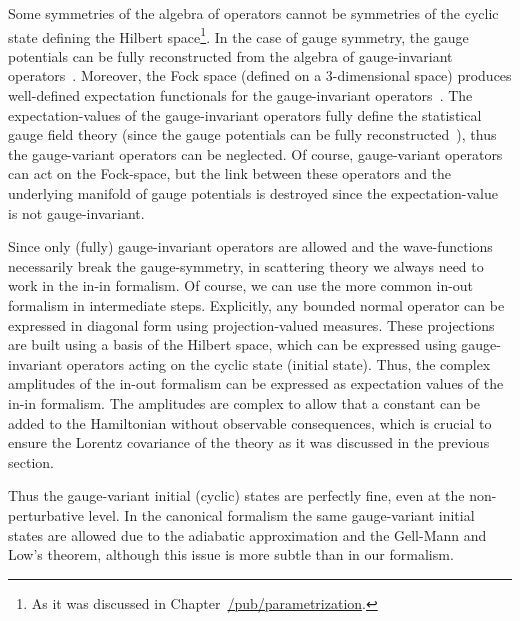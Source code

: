 \documentclass[11pt]{book}
\begin{document}
Some symmetries of the algebra of operators cannot be symmetries of the
cyclic state defining the Hilbert space\footnote{As it was discussed in
  Chapter~\href{https://timepiece.pubpub.org/pub/parametrization/\#gauge-transformations-constrained-systems-and-conditioned-probability}{/pub/parametrization}.}.
In the case of gauge symmetry, the gauge potentials can be fully
reconstructed from the algebra of gauge-invariant
operators~\cite{Giles1981Reconstruction}. Moreover, the Fock space (defined on a 3-dimensional space)
produces well-defined expectation functionals for the gauge-invariant
operators~\cite{Franuxe7ois2014Gauge}. The expectation-values of the gauge-invariant
operators fully define the statistical gauge field theory (since the
gauge potentials can be fully
reconstructed~\cite{Giles1981Reconstruction}), thus the gauge-variant operators can be neglected. Of course,
gauge-variant operators can act on the Fock-space, but the link between
these operators and the underlying manifold of gauge potentials is
destroyed since the expectation-value is not gauge-invariant.

Since only (fully) gauge-invariant operators are allowed and the
wave-functions necessarily break the gauge-symmetry, in scattering
theory we always need to work in the in-in formalism. Of course, we can
use the more common in-out formalism in intermediate steps. Explicitly,
any bounded normal operator can be expressed in diagonal form using
projection-valued measures. These projections are built using a basis of
the Hilbert space, which can be expressed using gauge-invariant
operators acting on the cyclic state (initial state). Thus, the complex
amplitudes of the in-out formalism can be expressed as expectation
values of the in-in formalism. The amplitudes are complex to allow that
a constant can be added to the Hamiltonian without observable
consequences, which is crucial to ensure the Lorentz covariance of the
theory as it was discussed in the previous section.

Thus the gauge-variant initial (cyclic) states are perfectly fine, even
at the non-perturbative level. In the canonical formalism the same
gauge-variant initial states are allowed due to the adiabatic
approximation and the Gell-Mann and Low's
theorem\cite{Molinari2007Another}\cite{Brouder2008Adiabatic}, although this issue is more subtle than in our
formalism\cite{Marzlin2004Inconsistency}.
\end{document}
